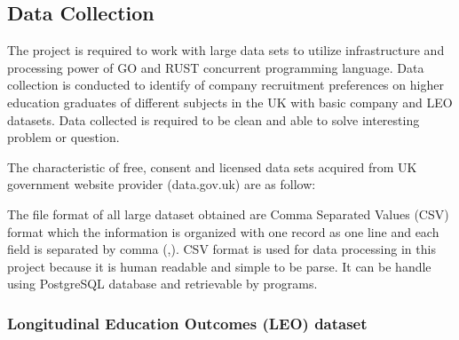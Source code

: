 \pagebreak

\subsection{Data Collection}

The project is required to work with large data sets to utilize infrastructure and processing power of GO and RUST concurrent programming language. Data collection is conducted to identify of company recruitment preferences on higher education graduates of different subjects in the UK with basic company and LEO datasets. Data collected is required to be clean and able to solve interesting problem or question. 

The characteristic of free, consent and licensed data sets acquired from UK government website provider (data.gov.uk) are as follow:

\begin{table}[H]
	\caption{Result of Golang programming on process CSV raw data}
\end{table}

The file format of all large dataset obtained are Comma Separated Values (CSV) format which the information is organized with one record as one line and each field is separated by comma (,). CSV format is used for data processing in this project because it is human readable and simple to be parse. It can be handle using PostgreSQL database and retrievable by programs. 

\pagebreak

\subsubsection{Longitudinal Education Outcomes (LEO) dataset }


